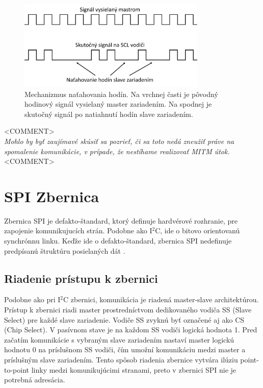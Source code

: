 \begin{figure}
    \centerline{\includegraphics[width=0.8\textwidth]{images/i2cStretch.png}}
    \caption[Mechanizmus naťahovania hodín]{Mechanizmus naťahovania hodín. Na vrchnej časti je pôvodný hodinový signál vysielaný master zariadením. Na spodnej je skutočný signál po natiahnutí hodín slave zariadením.}
    \label{obr:i2cStretch}
\end{figure}

\noindent<COMMENT>\\ 
\textit{Mohlo by byť zaujímavé skúsiť sa pozrieť, či sa toto nedá zneužiť práve na  spomalenie komunikácie, v prípade, že nestíhame realizovať MITM útok.}\\
<COMMENT>

\section{SPI Zbernica}
Zbernica SPI je defakto-štandard, ktorý definuje hardvérové rozhranie, pre zapojenie komunikujucích strán. Podobne ako I$^2$C, ide o bitovo orientovanú synchrónnu linku. Keďže ide o defakto-štandard, zbernica SPI nedefinuje predpísanú štruktúru posielaných dát \cite{spiBus}.

\subsection{Riadenie prístupu k zbernici}
Podobne ako pri I$^2$C zbernici, komunikácia je riadená master-slave architektúrou. Prístup k zbernici riadi master prostredníctvom dedikovaného vodiča SS (Slave Select) pre každé slave zariadenie. Vodiče SS zvyknú byť označené aj ako CS (Chip Select). V pasívnom stave je na každom SS vodiči logická hodnota 1. Pred začatím komunikácie s vybraným slave zariadením nastaví master logickú hodnotu 0 na príslušnom SS vodiči, čím umožní komunikáciu medzi master a príslušným slave zariadením. Tento spôsob riadenia zbernice vytvára ilúziu point-to-point linky medzi komunikujúcimi stranami, preto v zbernici SPI nie je potrebná adresácia.

